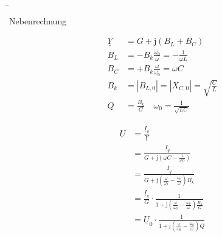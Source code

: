 \b{
\begin{frame}{Nebenrechnung}
\begin{minipage}{0.3\textwidth}
    \begin{align}
        \underline{Y} &= G + \mathrm{j}(B_L + B_C) \\
        B_L &= -B_k \frac{\omega_0}{\omega} = -\frac{1}{\omega L}\\
        B_C &= +B_k \frac{\omega}{\omega_0} = \omega C \\
        B_k &= |B_{L,0}| = |X_{C,0}| = \sqrt{\frac{C}{L}}\\
        Q &= \frac{B_k}{G} \quad \omega_0 = \frac{1}{\sqrt{LC}}
    \end{align}
\end{minipage}\hfill%
\begin{minipage}{0.65\textwidth}\centering
    \begin{equation}
        \begin{aligned}
    \underline{U} &= \frac{\underline{I}_q}{\underline{Y}} \\
    &= \frac{\underline{I}_q}{G + \mathrm{j}\left(\omega C - \frac{1}{\omega L}\right)} \\
    &= \frac{\underline{I}_q}{G + \mathrm{j}\left(\frac{\omega}{\omega_0} - \frac{\omega_0}{\omega}\right)B_k} \\
    &= \frac{\underline{I}_q}{G} \cdot \frac{1}{1 + \mathrm{j}\left(\frac{\omega}{\omega_0} - \frac{\omega_0}{\omega}\right)\frac{B_k}{G}} \\
    &= \underline{U}_0 \cdot \frac{1}{1 + \mathrm{j}\left(\frac{\omega}{\omega_0} - \frac{\omega_0}{\omega}\right)Q}
        \end{aligned}
    \end{equation}
\end{minipage}
\end{frame}
}


